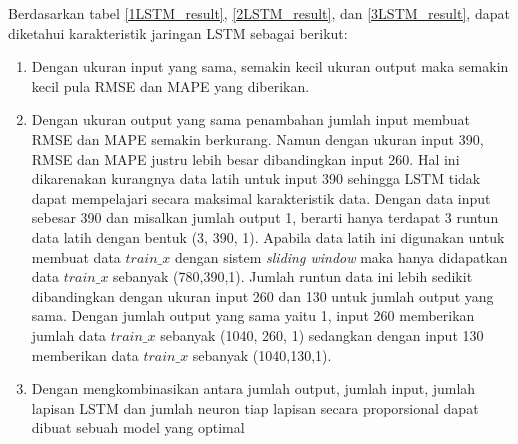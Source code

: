 \documentclass[../thesis.tex]{subfiles}
\begin{document}

Berdasarkan tabel \ref{1LSTM_result}, \ref{2LSTM_result}, dan \ref{3LSTM_result}, dapat diketahui karakteristik jaringan LSTM sebagai berikut:
\begin{enumerate}
	\item Dengan ukuran input yang sama, semakin kecil ukuran output maka semakin kecil pula RMSE dan MAPE yang diberikan. 
	\item Dengan ukuran output yang sama penambahan jumlah input membuat RMSE dan MAPE semakin berkurang. Namun dengan ukuran input 390, RMSE dan MAPE justru lebih besar dibandingkan input 260. Hal ini dikarenakan kurangnya data latih untuk input 390 sehingga LSTM tidak dapat mempelajari secara maksimal karakteristik data. Dengan data input sebesar 390  dan misalkan jumlah output 1, berarti hanya terdapat 3 runtun data latih dengan bentuk (3, 390, 1). Apabila data latih ini digunakan untuk membuat data $train\_x$ dengan sistem \textit{sliding window} maka hanya didapatkan data $train\_x$ sebanyak (780,390,1). Jumlah runtun data ini lebih sedikit dibandingkan dengan ukuran input 260 dan 130 untuk jumlah output yang sama. Dengan jumlah output yang sama yaitu 1, input 260 memberikan jumlah data $train\_x$ sebanyak (1040, 260, 1) sedangkan dengan input 130 memberikan data $train\_x$ sebanyak (1040,130,1).
	\item Dengan mengkombinasikan antara jumlah output, jumlah input, jumlah lapisan LSTM dan jumlah neuron tiap lapisan secara proporsional dapat dibuat sebuah model yang optimal  
\end{enumerate}
\end{document}
